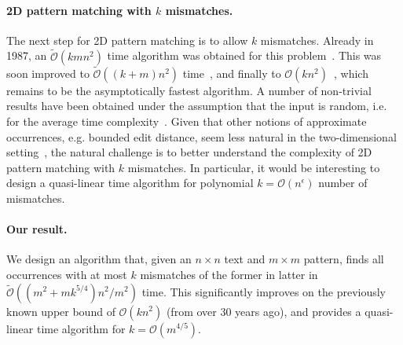 \documentclass[11pt, letterpaper]{article}
\theoremstyle{plain}
\theoremstyle{definition}
\theoremstyle{remark}
\renewcommand{\O}{\mathcal{O}}
\newcommand{\tO}{\tilde{\mathcal{O}}}
\begin{document}
\paragraph{2D pattern matching with $k$ mismatches.} The next step for 2D pattern matching is to allow $k$ mismatches.
Already in 1987, an $\tO(kmn^{2})$ time algorithm was obtained for this problem~\cite{Krithivasan1987}. This was
soon improved to $\tO((k+m)n^2)$ time~\cite{Ranka1991}, and finally to $\O(kn^2)$~\cite{Amir1991}, which remains
to be the asymptotically fastest algorithm. A number of non-trivial results have been obtained under the assumption
that the input is random, i.e. for the average time complexity~\cite{Baeza-Yates1998,Park1998,Kaerkkaeinen1999}.
Given that other notions of approximate occurrences, e.g. bounded edit distance, seem less natural in the two-dimensional
setting~\cite{Baeza-Yates1998a}, the natural challenge is to better understand the complexity
of 2D pattern matching with $k$ mismatches. In particular, it would be interesting to design a quasi-linear time
algorithm for polynomial $k=\O(n^{\epsilon})$ number of mismatches.

\paragraph{Our result.} We design an algorithm that, given an $n\times n$ text and $m\times m$ pattern, finds
all occurrences with at most $k$ mismatches of the former in latter in $\tO((m^2 + mk^{5/4})n^2 / m^2)$ time.
This significantly improves on the previously known upper bound of $\O(kn^{2})$ (from over 30 years ago),
and provides a quasi-linear time algorithm for $k=\O(m^{4/5})$. 
\end{document}
